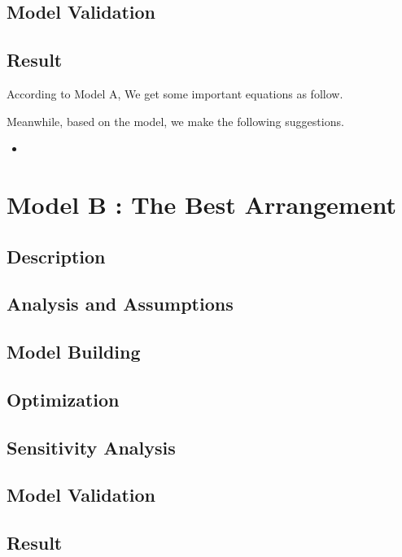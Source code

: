 \documentclass{mcmthesis}
\begin{document}
\subsection{Model Validation}

\subsection{Result}
\indent \indent According to Model A, We get some important equations as follow.

Meanwhile, based on the model, we make the following suggestions.
\begin{itemize}
  \item 
\end{itemize}


\section{Model B : The Best Arrangement}
\subsection{Description}
\subsection{Analysis and Assumptions}
\subsection{Model Building}
\subsection{Optimization}
\subsection{Sensitivity Analysis}
\subsection{Model Validation}
\subsection{Result}




\end{document}
